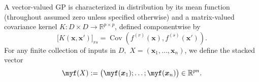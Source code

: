 \documentclass[11pt,a4paper]{article}
\begin{document}
A vector-valued GP is characterized in distribution by its mean function (throughout assumed zero unless specified otherwise) and a matrix-valued covariance kernel
$K : D \times D \to \mathbb{R}^{p\times p}$, defined componentwise by
\begin{displaymath}\bigl[K(\boldsymbol{x},\boldsymbol{x}')\bigr]_{rs} = \operatorname{Cov}\!\left(f^{(r)}(\boldsymbol{x}), f^{(s)}(\boldsymbol{x}')\right).\end{displaymath}
For any finite collection of inputs in $D,$ $X =(\boldsymbol{x}_1, \ldots,\boldsymbol{x}_n)$, we define the stacked vector \begin{displaymath}\myf(X) := \bigl( \myf(\boldsymbol{x}_1);\dots; \myf(\boldsymbol{x}_n) \bigr) \in \mathbb{R}^{pn}.\end{displaymath}
\end{document}
